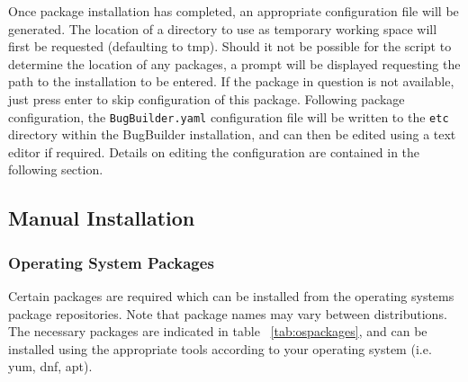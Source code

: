 \documentclass[a4paper,10pt]{article}
\begin{document}
\begin{enumerate}
Once package installation has completed, an appropriate configuration file will
be generated. The location of a directory to use as temporary working space
will first be requested (defaulting to \/tmp). Should it not be possible for
the script to determine the location of any packages, a prompt will be
displayed requesting the path to the installation to be entered. If the package
in question is not available, just press enter to skip configuration of this
package. Following package configuration, the {\tt BugBuilder.yaml}
configuration file will be written to the {\tt etc} directory within the
BugBuilder installation, and can then be edited using a text editor if
required. Details on editing the configuration are contained in the following
section.

\end{enumerate}

\subsection{Manual Installation}\label{sec:maninstall}
\subsubsection{Operating System Packages}

Certain packages are required which can be installed from the operating systems
package repositories. Note that package names may vary between distributions.
The necessary packages are indicated in table ~\ref{tab:ospackages}, and can be
installed using the appropriate tools according to your operating system (i.e.
yum, dnf, apt).
\end{document}
